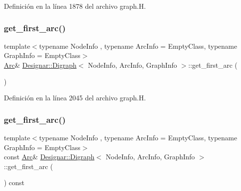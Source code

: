 Definición en la línea 1878 del archivo graph.\+H.

\mbox{\label{class_designar_1_1_digraph_af28c0708f3a09f172e4258772f56a476}} 
\subsubsection{\texorpdfstring{get\+\_\+first\+\_\+arc()}{get\_first\_arc()}\hspace{0.1cm}{\footnotesize\ttfamily [1/2]}}
{\footnotesize\ttfamily template$<$typename Node\+Info , typename Arc\+Info  = Empty\+Class, typename Graph\+Info  = Empty\+Class$>$ \\
\hyperlink{class_designar_1_1_digraph_a0ceb278671f2a535c00fddccdeafd69f}{Arc}\& \hyperlink{class_designar_1_1_digraph}{Designar\+::\+Digraph}$<$ Node\+Info, Arc\+Info, Graph\+Info $>$\+::get\+\_\+first\+\_\+arc (\begin{DoxyParamCaption}{ }\end{DoxyParamCaption})\hspace{0.3cm}{\ttfamily [inline]}}



Definición en la línea 2045 del archivo graph.\+H.

\mbox{\label{class_designar_1_1_digraph_a7842484a51df899e95a65e979d70079c}} 
\subsubsection{\texorpdfstring{get\+\_\+first\+\_\+arc()}{get\_first\_arc()}\hspace{0.1cm}{\footnotesize\ttfamily [2/2]}}
{\footnotesize\ttfamily template$<$typename Node\+Info , typename Arc\+Info  = Empty\+Class, typename Graph\+Info  = Empty\+Class$>$ \\
const \hyperlink{class_designar_1_1_digraph_a0ceb278671f2a535c00fddccdeafd69f}{Arc}\& \hyperlink{class_designar_1_1_digraph}{Designar\+::\+Digraph}$<$ Node\+Info, Arc\+Info, Graph\+Info $>$\+::get\+\_\+first\+\_\+arc (\begin{DoxyParamCaption}{ }\end{DoxyParamCaption}) const\hspace{0.3cm}{\ttfamily [inline]}}



